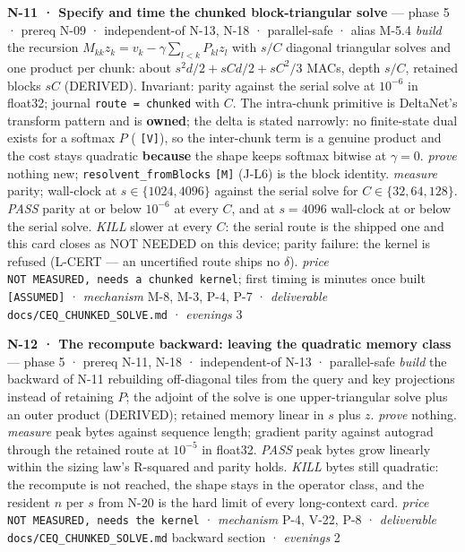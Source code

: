 \documentclass[11pt,a4paper]{article}
\theoremstyle{plain}
\theoremstyle{definition}
\theoremstyle{remark}
\begin{document}
\textbf{N-11 · Specify and time the chunked block-triangular solve} ---
phase 5 · prereq N-09 · independent-of N-13, N-18 · parallel-safe ·
alias M-5.4 \emph{build} the recursion
\(M_{kk}z_k=v_k-\gamma\sum_{l<k}P_{kl}z_l\) with \(s/C\) diagonal
triangular solves and one product per chunk: about
\(s^2d/2+sCd/2+sC^2/3\) MACs, depth \(s/C\), retained blocks \(sC\)
(DERIVED). Invariant: parity against the serial solve at \(10^{-6}\) in
float32; journal \texttt{route\ =\ chunked} with \(C\). The intra-chunk
primitive is DeltaNet's transform pattern and is \textbf{owned}; the
delta is stated narrowly: no finite-state dual exists for a softmax
\(P\) (\citep{hu-2025-ssdtheory} \texttt{{[}V{]}}), so the inter-chunk
term is a genuine product and the cost stays quadratic \textbf{because}
the shape keeps softmax bitwise at \(\gamma=0\). \emph{prove} nothing
new; \texttt{resolvent\_fromBlocks} \texttt{{[}M{]}} (J-L6) is the block
identity. \emph{measure} parity; wall-clock at \(s\in\{1024,4096\}\)
against the serial solve for \(C\in\{32,64,128\}\). \emph{PASS} parity
at or below \(10^{-6}\) at every \(C\), and at \(s=4096\) wall-clock at
or below the serial solve. \emph{KILL} slower at every \(C\): the serial
route is the shipped one and this card closes as NOT NEEDED on this
device; parity failure: the kernel is refused (L-CERT --- an uncertified
route ships no \(\delta\)). \emph{price}
\texttt{NOT\ MEASURED,\ needs\ a\ chunked\ kernel}; first timing is
minutes once built \texttt{{[}ASSUMED{]}} · \emph{mechanism} M-8, M-3,
P-4, P-7 · \emph{deliverable} \texttt{docs/CEQ\_CHUNKED\_SOLVE.md} ·
\emph{evenings} 3

\textbf{N-12 · The recompute backward: leaving the quadratic memory
class} --- phase 5 · prereq N-11, N-18 · independent-of N-13 ·
parallel-safe \emph{build} the backward of N-11 rebuilding off-diagonal
tiles from the query and key projections instead of retaining \(P\); the
adjoint of the solve is one upper-triangular solve plus an outer product
(DERIVED); retained memory linear in \(s\) plus \(z\). \emph{prove}
nothing. \emph{measure} peak bytes against sequence length; gradient
parity against autograd through the retained route at \(10^{-5}\) in
float32. \emph{PASS} peak bytes grow linearly within the sizing law's
R-squared and parity holds. \emph{KILL} bytes still quadratic: the
recompute is not reached, the shape stays in the operator class, and the
resident \(n\) per \(s\) from N-20 is the hard limit of every
long-context card. \emph{price}
\texttt{NOT\ MEASURED,\ needs\ the\ kernel} · \emph{mechanism} P-4,
V-22, P-8 · \emph{deliverable} \texttt{docs/CEQ\_CHUNKED\_SOLVE.md}
backward section · \emph{evenings} 2
\end{document}
